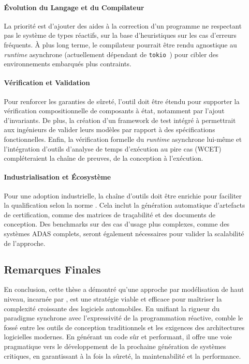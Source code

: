 \paragraph{Évolution du Langage et du Compilateur} La priorité est d'ajouter des aides à la
correction d'un programme ne respectant pas le système de types réactifs, sur la base d'heuristiques
sur les cas d'erreurs fréquents. À plus long terme, le compilateur pourrait être rendu agnostique au
\textit{runtime} asynchrone (actuellement dépendant de \texttt{tokio}~\cite{tokio}) pour cibler des
environnements embarqués plus contraints.

\paragraph{Vérification et Validation} Pour renforcer les garanties de sûreté, l'outil \GReusot doit
être étendu pour supporter la vérification compositionnelle de composants à état, notamment par
l'ajout d'invariants. De plus, la création d'un framework de test intégré à \GRust permettrait aux
ingénieurs de valider leurs modèles par rapport à des spécifications fonctionnelles. Enfin, la
vérification formelle du \textit{runtime} asynchrone lui-même et l'intégration d'outils d'analyse de
temps d'exécution au pire cas (WCET) compléteraient la chaîne de preuves, de la conception à
l'exécution.

\paragraph{Industrialisation et Écosystème} Pour une adoption industrielle, la chaîne d'outils
\GRust doit être enrichie pour faciliter la qualification selon la norme \iso. Cela inclut la
génération automatique d'artefacts de certification, comme des matrices de traçabilité et des
documents de conception. Des benchmarks sur des cas d'usage plus complexes, comme des systèmes ADAS
complets, seront également nécessaires pour valider la scalabilité de l'approche.

\subsection{Remarques Finales}

En conclusion, cette thèse a démontré qu'une approche par modélisation de haut niveau, incarnée par
\GRust, est une stratégie viable et efficace pour maîtriser la complexité croissante des logiciels
automobiles. En unifiant la rigueur du paradigme synchrone avec l'expressivité de la programmation
réactive, \GRust comble le fossé entre les outils de conception traditionnels et les exigences des
architectures logicielles modernes. En générant un code \Rust sûr et performant, il offre une voie
pragmatique vers le développement de la prochaine génération de systèmes critiques, en garantissant
à la fois la sûreté, la maintenabilité et la performance.
